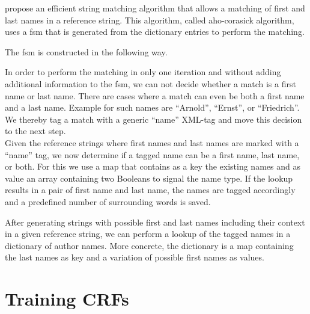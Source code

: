 \citet{aho1975efficient} propose an efficient string matching algorithm that allows a matching of first and last names in a reference string.
This algorithm, called \gls{aho-corasick algorithm}, uses a \gls{fsm} that is generated from the dictionary entries to perform the matching.

The \gls{fsm} is constructed in the following way.


In order to perform the matching in only one iteration and without adding additional information to the \gls{fsm}, we can not decide whether a match is a first name or last name.
There are cases where a match can even be both a first name and a last name.
Example for such names are ``Arnold'', ``Ernst'', or ``Friedrich''.
We thereby tag a match with a generic ``name'' XML-tag and move this decision to the next step.\\

Given the reference strings where first names and last names are marked with a ``name'' tag, we now determine if a tagged name can be a first name, last name, or both.
For this we use a map that contains as a key the existing names and as value an array containing two Booleans to signal the name type.
If the lookup results in a pair of first name and last name, the names are tagged accordingly and a predefined number of surrounding words is saved.

After generating strings with possible first and last names including their context in a given reference string, we can perform a lookup of the tagged names in a dictionary of author names.
More concrete, the dictionary is a map containing the last names as key and a variation of possible first names as values.





\section{Training CRFs}\label{sec:ae-training-crfs}

